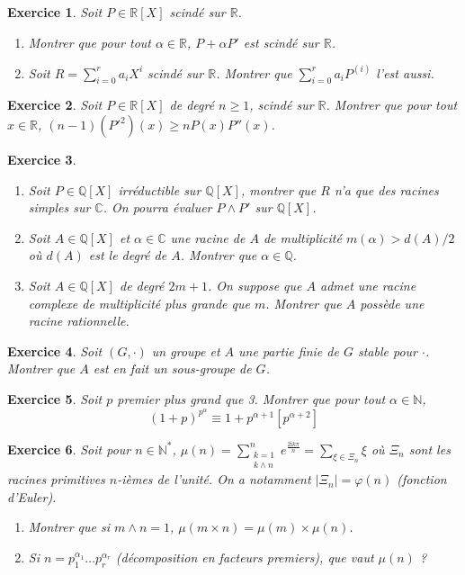 \documentclass[12pt]{article}
\newtheorem{exercise}{Exercice}[section]
\theoremstyle{remark}
\theoremstyle{remark}
\newcommand{\R}{\mathbb{R}}
\newcommand{\C}{\mathbb{C}}
\newcommand{\Q}{\mathbb{Q}}
\newcommand{\N}{\mathbb{N}}
\begin{document}
\begin{exercise}
	Soit $P\in\R[X]$ scindé sur $\R$.
	\begin{enumerate}
		\item Montrer que pour tout $\alpha\in\R$, $P+\alpha P'$ est scindé sur $\R$.
		\item Soit $R=\sum_{i=0}^{r}a_{i}X^{i}$ scindé sur $\R$. Montrer que
		$\sum_{i=0}^{r}a_{i}P^{(i)}$ l'est aussi.
	\end{enumerate}
\end{exercise}

\begin{exercise}
	Soit $P\in\R[X]$ de degré $n\geqslant1$, scindé sur $\R$. Montrer que pour
	tout $x\in\R$, $(n-1)(P'^{2})(x)\geqslant nP(x)P''(x)$.
\end{exercise}

\begin{exercise}
	\phantom{}
	\begin{enumerate}
		\item Soit $P\in\Q[X]$ irréductible sur $\Q[X]$, montrer que $R$ n'a que
		des racines simples sur $\C$. On pourra évaluer $P\wedge P'$ sur
		$\Q[X]$.
		\item Soit $A\in\Q[X]$ et $\alpha\in\C$ une racine de $A$ de
		multiplicité $m(\alpha)>d(A)/2$ où $d(A)$ est le degré de $A$. Montrer
		que $\alpha\in\Q$.
		\item Soit $A\in\Q[X]$ de degré $2m+1$. On suppose que $A$ admet une
		racine complexe de multiplicité plus grande que $m$. Montrer que $A$
		possède une racine rationnelle.
	\end{enumerate}
\end{exercise}

\begin{exercise}
	Soit $(G,\cdot)$ un groupe et $A$ une partie finie de $G$ stable pour
	$\cdot$. Montrer que $A$ est en fait un sous-groupe de $G$.
\end{exercise}

\begin{exercise}
	Soit $p$ premier plus grand que 3. Montrer que pour tout $\alpha\in\N$,
	$$(1+p)^{p^{\alpha}}\equiv 1+p^{\alpha+1}[p^{\alpha+2}]$$
\end{exercise}

\begin{exercise}
	Soit pour $n\in\N^{*}$, $\mu(n)=\sum_{\substack{k=1\\k\wedge
	n}}^{n}e^{\frac{2\mathrm{i}k\pi}{n}}=\sum_{\xi\in\Xi_{n}}\xi$ où $\Xi_{n}$
	sont les racines primitives $n$-ièmes de l'unité. On a notamment
	$\vert\Xi_{n}\vert=\varphi(n)$ (fonction d'Euler).
	\begin{enumerate}
		\item Montrer que si $m\wedge n=1$, $\mu(m\times n)=\mu(m)\times\mu(n)$.
		\item Si $n=p_{1}^{\alpha_{1}}\dots p_{r}^{\alpha_{r}}$ (décomposition
		en facteurs premiers), que vaut $\mu(n)$ ?
	\end{enumerate}
\end{exercise}
\end{document}
